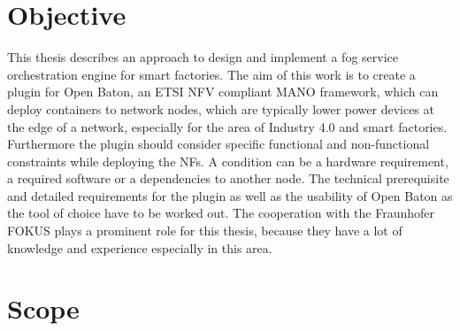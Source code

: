 \section{Objective}



This thesis describes an approach to design and implement a fog service orchestration engine for smart factories.
The aim of this work is to create a plugin for Open Baton, an \ac{ETSI} \ac{NFV} compliant \ac{MANO} framework, which can deploy containers to network nodes, which are typically lower power devices at the edge of a network, especially for the area of Industry 4.0 and smart factories.
Furthermore the plugin should consider specific functional and non-functional constraints while deploying the \acp{NF}.
A condition can be a hardware requirement, a required software or a dependencies to another node.
The technical prerequisite and detailed requirements for the plugin as well as the usability of Open Baton as the tool of choice have to be worked out.
The cooperation with the Fraunhofer FOKUS plays a prominent role for this thesis, because they have a lot of knowledge and experience especially in this area.


\section{Scope}


